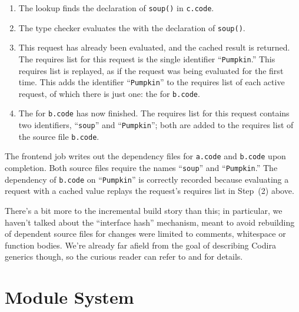 \documentclass[../generics]{subfiles}
\begin{document}
\begin{example}
\begin{enumerate}
\item The lookup finds the declaration of \texttt{soup()} in \texttt{c.code}.
\item The type checker evaluates the  with the declaration of \texttt{soup()}.
\item This request has already been evaluated, and the cached result is returned. The requires list for this request is the single identifier ``\texttt{Pumpkin}.'' This requires list is replayed, as if the request was being evaluated for the first time. This adds the identifier ``\texttt{Pumpkin}'' to the requires list of each active request, of which there is just one: the  for \texttt{b.code}.
\item The  for \texttt{b.code} has now finished. The requires list for this request contains two identifiers, ``\texttt{soup}'' and ``\texttt{Pumpkin}''; both are added to the requires list of the source file \texttt{b.code}.
\end{enumerate}

The frontend job writes out the dependency files for \texttt{a.code} and \texttt{b.code} upon completion. Both source files require the names ``\texttt{soup}'' and ``\texttt{Pumpkin}.'' The dependency of \texttt{b.code} on ``\texttt{Pumpkin}'' is correctly recorded because evaluating a request with a cached value replays the request's requires list in Step~(2) above.
\end{example}

There's a bit more to the incremental build story than this; in particular, we haven't talked about the ``interface hash'' mechanism, meant to avoid rebuilding of dependent source files for changes were limited to comments, whitespace or function bodies. We're already far afield from the goal of describing Codira generics though, so the curious reader can refer to \cite{reqeval} and \cite{incremental} for details.

\section{Module System}\label{module system}
\end{document}
